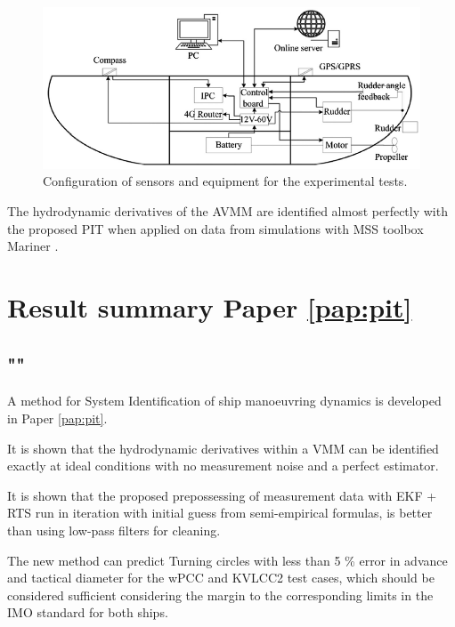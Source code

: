 \begin{figure}[h]
    \centering
    \includegraphics[width=\textwidth]{kappa/images/cth_model.png}
    \caption{Configuration of sensors and equipment for the experimental tests.}
    \label{fig:cthmodel}
\end{figure}

The hydrodynamic derivatives of the AVMM are identified almost perfectly with the proposed PIT when applied on data from simulations with MSS toolbox Mariner \cite{tristan_matlab_2009}.




\section{Result summary Paper \ref{pap:pit}}
\subsection*{""}
A method for System Identification of ship manoeuvring dynamics is developed in Paper \ref{pap:pit}. 

It is shown that the hydrodynamic derivatives within a VMM can be identified exactly at ideal conditions with no measurement noise and a perfect estimator.

It is shown that the proposed prepossessing of measurement data with EKF + RTS run in iteration with initial guess from semi-empirical formulas, is better than using low-pass filters for cleaning.

The new method can predict Turning circles with less than 5 \% error in advance and tactical diameter for the wPCC and KVLCC2 test cases, which should be considered sufficient considering the margin to the corresponding limits in the IMO standard for both ships.